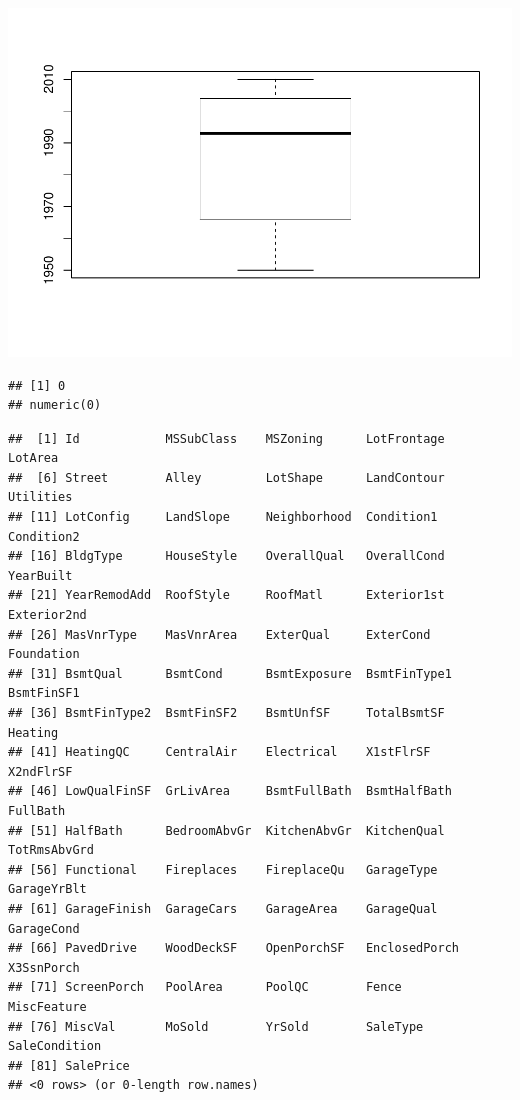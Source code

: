 \documentclass[]{article}
\begin{document}
\includegraphics{EDA_files/figure-latex/unnamed-chunk-43-1.pdf}

\begin{verbatim}
## [1] 0
## numeric(0)
\end{verbatim}

\begin{verbatim}
##  [1] Id            MSSubClass    MSZoning      LotFrontage   LotArea      
##  [6] Street        Alley         LotShape      LandContour   Utilities    
## [11] LotConfig     LandSlope     Neighborhood  Condition1    Condition2   
## [16] BldgType      HouseStyle    OverallQual   OverallCond   YearBuilt    
## [21] YearRemodAdd  RoofStyle     RoofMatl      Exterior1st   Exterior2nd  
## [26] MasVnrType    MasVnrArea    ExterQual     ExterCond     Foundation   
## [31] BsmtQual      BsmtCond      BsmtExposure  BsmtFinType1  BsmtFinSF1   
## [36] BsmtFinType2  BsmtFinSF2    BsmtUnfSF     TotalBsmtSF   Heating      
## [41] HeatingQC     CentralAir    Electrical    X1stFlrSF     X2ndFlrSF    
## [46] LowQualFinSF  GrLivArea     BsmtFullBath  BsmtHalfBath  FullBath     
## [51] HalfBath      BedroomAbvGr  KitchenAbvGr  KitchenQual   TotRmsAbvGrd 
## [56] Functional    Fireplaces    FireplaceQu   GarageType    GarageYrBlt  
## [61] GarageFinish  GarageCars    GarageArea    GarageQual    GarageCond   
## [66] PavedDrive    WoodDeckSF    OpenPorchSF   EnclosedPorch X3SsnPorch   
## [71] ScreenPorch   PoolArea      PoolQC        Fence         MiscFeature  
## [76] MiscVal       MoSold        YrSold        SaleType      SaleCondition
## [81] SalePrice    
## <0 rows> (or 0-length row.names)
\end{verbatim}
\end{document}
